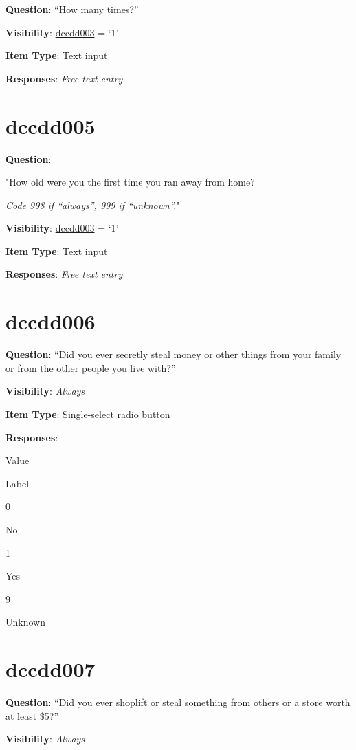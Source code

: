 \documentclass[]{book}
\begin{document}
\textbf{Question}: ``How many times?''

\textbf{Visibility}: \protect\hyperlink{dccdd003}{dccdd003} = `1'

\textbf{Item Type}: Text input

\textbf{Responses}: \emph{Free text entry}

\hypertarget{dccdd005}{%
\section{dccdd005}\label{dccdd005}}

\textbf{Question}:

"How old were you the first time you ran away from home?

\emph{Code 998 if ``always'', 999 if ``unknown''.}"

\textbf{Visibility}: \protect\hyperlink{dccdd003}{dccdd003} = `1'

\textbf{Item Type}: Text input

\textbf{Responses}: \emph{Free text entry}

\hypertarget{dccdd006}{%
\section{dccdd006}\label{dccdd006}}

\textbf{Question}: ``Did you ever secretly steal money or other things from your family or from the other people you live with?''

\textbf{Visibility}: \emph{Always}

\textbf{Item Type}: Single-select radio button

\textbf{Responses}:

Value

Label

0

No

1

Yes

9

Unknown

\hypertarget{dccdd007}{%
\section{dccdd007}\label{dccdd007}}

\textbf{Question}: ``Did you ever shoplift or steal something from others or a store worth at least \$5?''

\textbf{Visibility}: \emph{Always}
\end{document}
